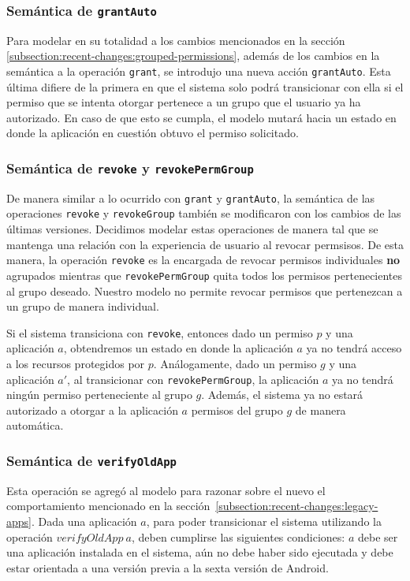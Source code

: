 \subsubsection{Semántica de \texttt{grantAuto}}

Para modelar en su totalidad a los cambios mencionados en la sección
\ref{subsection:recent-changes:grouped-permissions}, además de los cambios en la semántica a la
operación \texttt{grant}, se introdujo una nueva acción \texttt{grantAuto}. Esta última difiere de la
primera en que el sistema solo podrá transicionar con ella si el permiso que se intenta otorgar
pertenece a un grupo que el usuario ya ha autorizado. En caso de que esto se cumpla, el modelo mutará
hacia un estado en donde la aplicación en cuestión obtuvo el permiso solicitado.

\subsubsection{Semántica de \texttt{revoke} y \texttt{revokePermGroup}}

De manera similar a lo ocurrido con \texttt{grant} y \texttt{grantAuto}, la semántica de las
operaciones  \texttt{revoke} y \texttt{revokeGroup} también se modificaron con los cambios de las
últimas versiones. Decidimos modelar estas operaciones de manera tal que se mantenga una relación con
la experiencia de usuario al revocar permsisos. De esta manera, la operación \texttt{revoke} es la
encargada de revocar permisos individuales \textbf{no} agrupados mientras que \texttt{revokePermGroup}
quita todos los permisos pertenecientes al grupo deseado. Nuestro modelo no permite revocar permisos
que pertenezcan a un grupo de manera individual.

Si el sistema transiciona con \texttt{revoke}, entonces dado un permiso $p$ y una aplicación $a$,
obtendremos un estado en donde la aplicación $a$ ya no tendrá acceso a los recursos protegidos por
$p$. Análogamente, dado un permiso $g$ y una aplicación $a'$, al transicionar con
\texttt{revokePermGroup}, la aplicación $a$ ya no tendrá ningún permiso perteneciente al grupo $g$.
Además, el sistema ya no estará autorizado a otorgar a la aplicación $a$ permisos del grupo $g$ de
manera automática.


\subsubsection{Semántica de \texttt{verifyOldApp}}

Esta operación se agregó al modelo para razonar sobre el nuevo el comportamiento mencionado en la
sección~\ref{subsection:recent-changes:legacy-apps}. Dada una aplicación $a$, para poder transicionar
el sistema utilizando la operación $verifyOldApp\ a$, deben cumplirse las siguientes condiciones: $a$
debe ser una aplicación instalada en el sistema, aún no debe haber sido ejecutada y debe estar
orientada a una versión previa a la sexta versión de Android.


